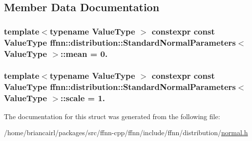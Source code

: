 \subsection{Member Data Documentation}
\hypertarget{structffnn_1_1distribution_1_1_standard_normal_parameters_a94d8bae101a2203451f19d19cf4f5ba0}{
\subsubsection[{mean}]{\setlength{\rightskip}{0pt plus 5cm}template$<$typename Value\-Type $>$ constexpr const Value\-Type {\bf ffnn\-::distribution\-::\-Standard\-Normal\-Parameters}$<$ Value\-Type $>$\-::mean = 0.\hspace{0.3cm}{\ttfamily [static]}}}\label{structffnn_1_1distribution_1_1_standard_normal_parameters_a94d8bae101a2203451f19d19cf4f5ba0}
\hypertarget{structffnn_1_1distribution_1_1_standard_normal_parameters_a67fa6f41f870e9cb7ac71df8ddbe8155}{
\subsubsection[{scale}]{\setlength{\rightskip}{0pt plus 5cm}template$<$typename Value\-Type $>$ constexpr const Value\-Type {\bf ffnn\-::distribution\-::\-Standard\-Normal\-Parameters}$<$ Value\-Type $>$\-::scale = 1.\hspace{0.3cm}{\ttfamily [static]}}}\label{structffnn_1_1distribution_1_1_standard_normal_parameters_a67fa6f41f870e9cb7ac71df8ddbe8155}


The documentation for this struct was generated from the following file\-:\begin{DoxyCompactItemize}
\item 
/home/briancairl/packages/src/ffnn-\/cpp/ffnn/include/ffnn/distribution/\hyperlink{normal_8h}{normal.\-h}\end{DoxyCompactItemize}
